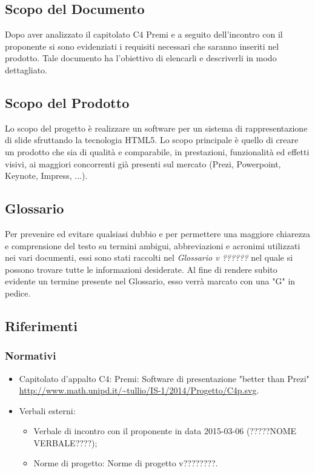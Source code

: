 \subsection{Scopo del Documento}
Dopo aver analizzato il capitolato C4 Premi e a seguito dell'incontro con il proponente si sono evidenziati i requisiti
necessari che saranno inseriti nel prodotto. Tale documento ha l'obiettivo di elencarli e descriverli in modo dettagliato.

\subsection{Scopo del Prodotto}
Lo scopo del progetto è realizzare un software per un sistema di rappresentazione di slide sfruttando la tecnologia \gls{HTML5}.
Lo scopo principale è quello di creare un prodotto che sia di qualità e comparabile, in prestazioni, funzionalità ed 
effetti visivi, ai maggiori concorrenti già presenti sul mercato (Prezi, Powerpoint, Keynote, Impress, ...).

\subsection{Glossario}
Per prevenire ed evitare qualsiasi dubbio e per permettere una maggiore chiarezza e
comprensione del testo su termini ambigui, abbreviazioni e acronimi utilizzati nei vari documenti,
essi sono stati raccolti nel \textit{Glossario v ??????} nel quale si possono trovare tutte le informazioni desiderate.
Al fine di rendere subito evidente un termine presente nel Glossario, esso verrà marcato con una "G" in pedice.

\subsection{Riferimenti}
\subsubsection{Normativi}
\begin{itemize}
	\item Capitolato d'appalto C4: Premi: Software di presentazione "better than Prezi"
	\newline \url{http://www.math.unipd.it/~tullio/IS-1/2014/Progetto/C4p.svg}.
	\item Verbali esterni:
	\begin{itemize}
		\item Verbale di incontro con il proponente in data 2015-03-06 (?????NOME VERBALE????);
		\item Norme di progetto: Norme di progetto v????????.
	\end{itemize}
\end{itemize}
